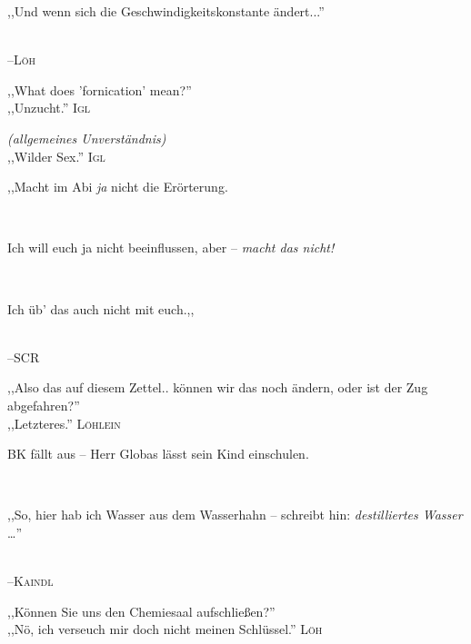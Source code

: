 \vspace{3mm}
{\raggedright ,,Und wenn sich die Geschwindigkeitskonstante ändert...''}\\
\raggedleft \textsc{\footnotesize --\/Löh}\\

\vspace{3mm}
\hangindent=0.7cm
\raggedright \textsc{\footnotesize } ,,What does 'fornication' mean?''\\
\raggedleft ,,Unzucht.'' \textsc{\footnotesize Igl}\\
\raggedright \emph{\footnotesize (allgemeines Unverständnis)}\\
\raggedleft ,,Wilder Sex.'' \textsc{\footnotesize Igl}\\

\vspace{3mm}
{\raggedright ,,Macht im Abi \emph{ja} nicht die Erörterung.}\\
{\raggedright Ich will euch ja nicht beeinflussen, aber -- \emph{macht das nicht!}}\\
{\raggedright Ich üb' das auch nicht mit euch.,,}\\
\raggedleft \textsc{\footnotesize --\/SCR}\\

\vspace{3mm}
\hangindent=0.7cm
\raggedright \textsc{\footnotesize } ,,Also das auf diesem Zettel.. können wir das noch ändern, oder ist der Zug abgefahren?''\\
\raggedleft ,,Letzteres.'' \textsc{\footnotesize Löhlein}\\

\vspace{3mm}
{\raggedright BK fällt aus -- Herr Globas lässt sein Kind einschulen.}\\

\vspace{3mm}
{\raggedright ,,So, hier hab ich Wasser aus dem Wasserhahn -- schreibt hin: \emph{destilliertes Wasser} …''}\\
\raggedleft \textsc{\footnotesize --\/Kaindl}\\

\vspace{3mm}
\hangindent=0.7cm
\raggedright \textsc{\footnotesize } ,,Können Sie uns den Chemiesaal aufschließen?''\\
\raggedleft ,,Nö, ich verseuch mir doch nicht meinen Schlüssel.'' \textsc{\footnotesize Löh}\\


